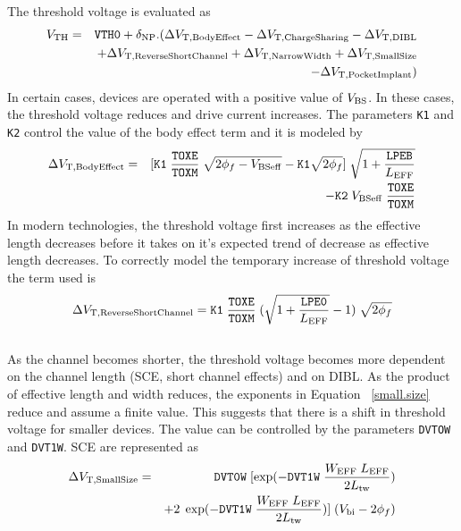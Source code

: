 \documentclass{article}
\begin{document}
\noindent The threshold voltage is evaluated as
\begin{eqnarray}
V_{\rm{TH}} & = & \texttt{VTH0} + \delta_{\rm{NP}}.(\Delta
V_{\rm{T,BodyEffect}}
- \Delta V_{\rm{T,ChargeSharing}} - \Delta V_{\rm{T,DIBL}} \nonumber\\
& & + \Delta V_{\rm{T,ReverseShortChannel}} + \Delta
V_{\rm{T,NarrowWidth}} + \Delta V_{\rm{T,SmallSize}} \nonumber\\
& & - \Delta V_{\rm{T,PocketImplant}})
\end{eqnarray}
In certain cases, devices are operated with a positive value of
$V_{\rm{BS}}$. In these cases, the threshold voltage reduces and
drive current increases. The parameters \texttt{K1} and
\texttt{K2} control the value of the body effect term and it is
modeled by
\begin{eqnarray}
\Delta V_{\rm{T,BodyEffect}}& = & [\texttt{K1} \; {\texttt{TOXE}
\over \texttt{TOXM}} \; \sqrt{2 \phi_f - V_{\rm{BSeff}}} -
\texttt{K1}
\sqrt{2 \phi_f}] \; \sqrt{1 + {\texttt{LPEB} \over L_{\rm{EFF}}}} \nonumber \\
& & - \texttt{K2} \; V_{\rm{BSeff}} \; {\texttt{TOXE} \over
\texttt{TOXM}}
\end{eqnarray}
In modern technologies, the threshold voltage first increases as
the effective length decreases before it takes on it's expected
trend of decrease as effective length decreases. To correctly
model the temporary increase of threshold voltage the term used is
\begin{equation}
\Delta V_{\rm{T,ReverseShortChannel}} = \texttt{K1} \;
{\texttt{TOXE} \over \texttt{TOXM}}\; (\sqrt{1 + {\texttt{LPE0}
\over L_{\rm{EFF}}}} - 1) \; \sqrt{2 \phi_f}
\end{equation}
\\
\indent As the channel becomes shorter, the threshold voltage
becomes more dependent on the channel length (SCE, short channel
effects) and on DIBL. As the product of effective length and width
reduces, the exponents in Equation ~\ref{small.size} reduce and
assume a finite value. This suggests that there is a shift in
threshold voltage for smaller devices. The value can be controlled
by the parameters \texttt{DVTOW} and \texttt{DVT1W}. SCE are
represented as
\begin{eqnarray}
\Delta V_{\rm{T,SmallSize}} & = & \texttt{DVT0W} \;
[\exp(-\texttt{DVT1W}\;
{W_{\rm{EFF}} \; L_{\rm{EFF}} \over 2 L_{\rm{tw}}}) \nonumber \\
& & + 2 \; \exp(-\texttt{DVT1W}\; {W_{\rm{EFF}} \; L_{\rm{EFF}}
\over 2 L_{\rm{tw}}})] \; (V_{\rm{bi}} - 2 \phi_f)
\label{small.size}
\end{eqnarray}
\end{document}
